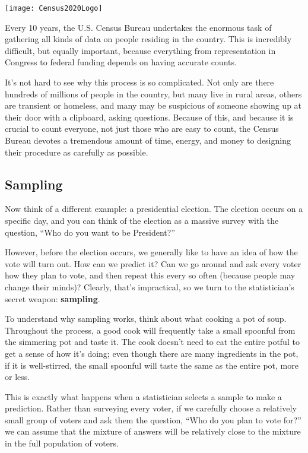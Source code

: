 \setcounter{ExampleCounter}{1}
\begin{center}
\texttt{[image: Census2020Logo]}
\end{center}
Every 10 years, the U.S. Census Bureau undertakes the enormous task of gathering all kinds of data on people residing in the country.  This is incredibly difficult, but equally important, because everything from representation in Congress to federal funding depends on having accurate counts.

It's not hard to see why this process is so complicated.  Not only are there hundreds of millions of people in the country, but many live in rural areas, others are transient or homeless, and many may be suspicious of someone showing up at their door with a clipboard, asking questions.  Because of this, and because it is crucial to count everyone, not just those who are easy to count, the Census Bureau devotes a tremendous amount of time, energy, and money to designing their procedure as carefully as possible.

\subsection{Sampling}
Now think of a different example: a presidential election.  The election occurs on a specific day, and you can think of the election as a massive survey with the question, ``Who do you want to be President?''

However, before the election occurs, we generally like to have an idea of how the vote will turn out.  How can we predict it?  Can we go around and ask every voter how they plan to vote, and then repeat this every so often (because people may change their minds)?  Clearly, that's impractical, so we turn to the statistician's secret weapon: \textbf{sampling}.

To understand why sampling works, think about what cooking a pot of soup.  Throughout the process, a good cook will frequently take a small spoonful from the simmering pot and taste it.  The cook doesn't need to eat the entire potful to get a sense of how it's doing; even though there are many ingredients in the pot, if it is well-stirred, the small spoonful will taste the same as the entire pot, more or less.

This is exactly what happens when a statistician selects a sample to make a prediction.  Rather than surveying every voter, if we carefully choose a relatively small group of voters and ask them the question, ``Who do you plan to vote for?'' we can assume that the mixture of answers will be relatively close to the mixture in the full population of voters.

